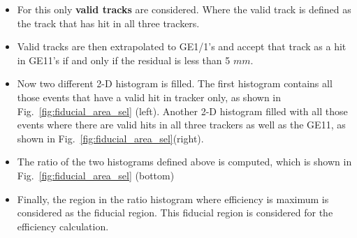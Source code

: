 \begin{itemize}
        \item For this only \textbf{valid tracks} are considered. Where the valid track is defined as the track that has hit in all three trackers.
        \item Valid tracks are then extrapolated to GE1/1’s and accept that track as a hit in GE11’s if and only if the residual is less than 5 $mm$.
        \item Now two different 2-D histogram is filled. The first histogram contains all those events that have a valid hit in tracker only, as shown in Fig.~\ref{fig:fiducial_area_sel} (left). Another 2-D histogram filled with all those events where there are valid hits in all three trackers as well as the GE11, as shown in Fig.~\ref{fig:fiducial_area_sel}(right).
        \item The ratio of the two histograms defined above is computed, which is shown in Fig.~\ref{fig:fiducial_area_sel} (bottom)
        \item Finally, the region in the ratio histogram where efficiency is maximum is considered as the fiducial region. This fiducial region is considered for the efficiency calculation.
\end{itemize}
